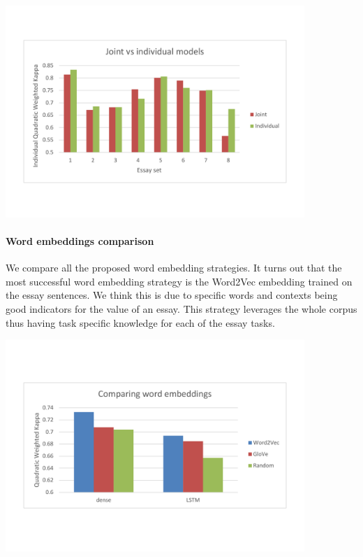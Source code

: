 \documentclass[a4paper,12pt,english]{article}
\begin{document}
\begin{center}
\vspace*{-1.5cm}
\includegraphics[width=0.85\textwidth]{fig/joint_vs_indiv.pdf}
\vspace*{-1.5cm}
\end{center}

\paragraph{Word embeddings comparison} We compare all the proposed word embedding strategies. It turns out that the most successful word embedding strategy is the Word2Vec embedding trained on the essay sentences. We think this is due to specific words and contexts being good indicators for the value of an essay. This strategy leverages the whole corpus thus having task specific knowledge for each of the essay tasks.

\begin{center}
\vspace*{-1.5cm}
\includegraphics[width=0.85\textwidth]{fig/word_embeddings.pdf}
\vspace*{-1.5cm}
\end{center}
\end{document}
